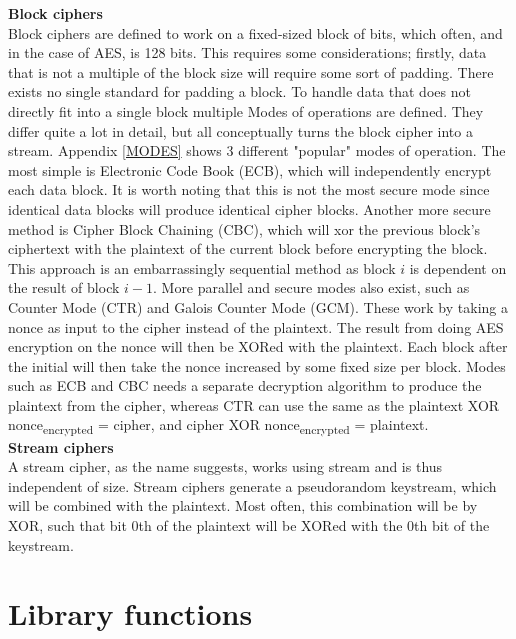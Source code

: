 \documentclass[a4paper, openany]{book}
\begin{document}
\begin{abstact}
\textbf{Block ciphers}\\
Block ciphers are defined to work on a fixed-sized block of bits, which often, and in the case of AES, is 128 bits. This requires some considerations; firstly, data that is not a multiple of the block size will require some sort of padding. There exists no single standard for padding a block. To handle data that does not directly fit into a single block multiple Modes of operations are defined. They differ quite a lot in detail, but all conceptually turns the block cipher into a stream. Appendix \ref{MODES} shows 3 different "popular" modes of operation. The most simple is Electronic Code Book (ECB), which will independently encrypt each data block. It is worth noting that this is not the most secure mode since identical data blocks will produce identical cipher blocks. Another more secure method is Cipher Block Chaining (CBC), which will xor the previous block's ciphertext with the plaintext of the current block before encrypting the block. This approach is an embarrassingly sequential method as block \(i\) is dependent on the result of block \(i-1\). More parallel and secure modes also exist, such as Counter Mode (CTR) and Galois Counter Mode (GCM). These work by taking a nonce as input to the cipher instead of the plaintext. The result from doing AES encryption on the nonce will then be XORed with the plaintext. Each block after the initial will then take the nonce increased by some fixed size per block. Modes such as ECB and CBC needs a separate decryption algorithm to produce the plaintext from the cipher, whereas CTR can use the same as the plaintext XOR nonce\textsubscript{encrypted} = cipher, and cipher XOR nonce\textsubscript{encrypted} = plaintext.\\

\textbf{Stream ciphers}\\
A stream cipher, as the name suggests, works using stream and is thus independent of size. Stream ciphers generate a pseudorandom keystream, which will be combined with the plaintext. Most often, this combination will be by XOR, such that bit 0th of the plaintext will be XORed with the 0th bit of the keystream.
\chapter{Library functions}
\label{sec:org4b54868}

\end{abstact}
\end{document}
